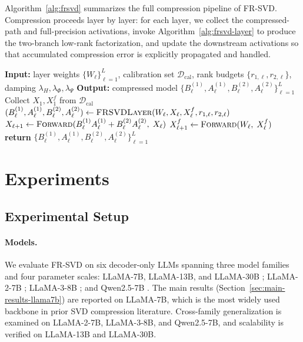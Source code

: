 \documentclass[a4paper,fleqn]{cas-dc}
\begin{document}
Algorithm~\ref{alg:frsvd} summarizes the full compression pipeline of FR-SVD. Compression proceeds layer by layer: for each layer, we collect the compressed-path and full-precision activations, invoke Algorithm~\ref{alg:frsvd-layer} to produce the two-branch low-rank factorization, and update the downstream activations so that accumulated compression error is explicitly propagated and handled.

\begin{algorithm}[t]
\caption{FR-SVD: full compression pipeline}
\label{alg:frsvd}
\small
\begin{algorithmic}[1]
\State \textbf{Input:}\; layer weights $\{W_\ell\}_{\ell=1}^{L}$, calibration set $\mathcal{D}_{\mathrm{cal}}$,
\Statex \hspace{3.2em} rank budgets $\{r_{1,\ell}, r_{2,\ell}\}$, damping $\lambda_H, \lambda_\Phi, \lambda_\Psi$
\State \textbf{Output:}\; compressed model $\{B_\ell^{(1)}, A_\ell^{(1)}, B_\ell^{(2)}, A_\ell^{(2)}\}_{\ell=1}^{L}$
\State Collect $X_1, X_1^f$ from $\mathcal{D}_{\mathrm{cal}}$ 
    \State $(B_\ell^{(1)}, A_\ell^{(1)}, B_\ell^{(2)}, A_\ell^{(2)}) \gets \Call{FRSVDLayer}{W_\ell, X_\ell, X_\ell^f, r_{1,\ell}, r_{2,\ell}}$ 
    \State $X_{\ell+1} \gets \Call{Forward}{B_\ell^{(1)}A_\ell^{(1)} + B_\ell^{(2)}A_\ell^{(2)},\; X_\ell}$ 
    \State $X_{\ell+1}^f \gets \Call{Forward}{W_\ell,\; X_\ell^f}$ 
\EndFor
\State \textbf{return} $\{B_\ell^{(1)}, A_\ell^{(1)}, B_\ell^{(2)}, A_\ell^{(2)}\}_{\ell=1}^{L}$
\end{algorithmic}
\end{algorithm}

\section{Experiments}

\subsection{Experimental Setup}

\paragraph{Models.}
We evaluate FR-SVD on six decoder-only LLMs spanning three model families and four parameter scales: LLaMA-7B, LLaMA-13B, and LLaMA-30B \citep{touvron2023llama}; LLaMA-2-7B \citep{touvron2023llama2}; LLaMA-3-8B \citep{dubey2024llama3}; and Qwen2.5-7B \citep{yang2024qwen25}. The main results (Section~\ref{sec:main-results-llama7b}) are reported on LLaMA-7B, which is the most widely used backbone in prior SVD compression literature. Cross-family generalization is examined on LLaMA-2-7B, LLaMA-3-8B, and Qwen2.5-7B, and scalability is verified on LLaMA-13B and LLaMA-30B.
\end{document}
